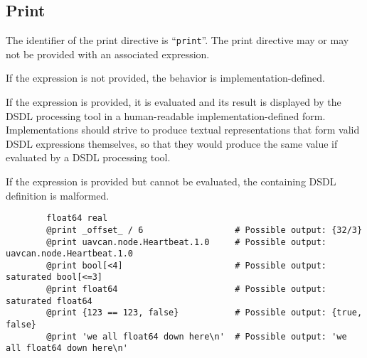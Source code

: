 \subsection{Print}

The identifier of the print directive is ``\verb|print|''.
The print directive may or may not be provided with an associated expression.

If the expression is not provided, the behavior is implementation-defined.

If the expression is provided, it is evaluated and its result is displayed by the DSDL processing tool in
a human-readable implementation-defined form.
Implementations should strive to produce textual representations that form valid DSDL expressions themselves,
so that they would produce the same value if evaluated by a DSDL processing tool.

If the expression is provided but cannot be evaluated, the containing DSDL definition is malformed.

\begin{remark}
    \begin{verbatim}
        float64 real
        @print _offset_ / 6                  # Possible output: {32/3}
        @print uavcan.node.Heartbeat.1.0     # Possible output: uavcan.node.Heartbeat.1.0
        @print bool[<4]                      # Possible output: saturated bool[<=3]
        @print float64                       # Possible output: saturated float64
        @print {123 == 123, false}           # Possible output: {true, false}
        @print 'we all float64 down here\n'  # Possible output: 'we all float64 down here\n'
    \end{verbatim}
\end{remark}

